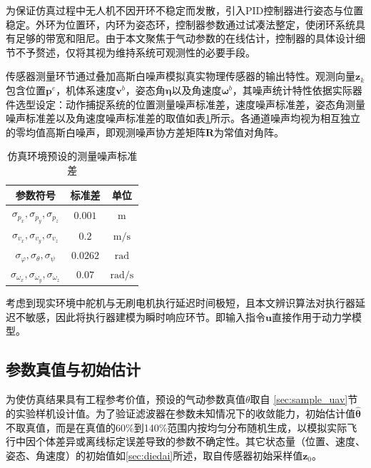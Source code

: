 为保证仿真过程中无人机不因开环不稳定而发散，引入PID控制器进行姿态与位置稳定。外环为位置环，内环为姿态环，控制器参数通过试凑法整定，使闭环系统具有足够的带宽和阻尼。由于本文聚焦于气动参数的在线估计，控制器的具体设计细节不予赘述，仅将其视为维持系统可观测性的必要手段。

传感器测量环节通过叠加高斯白噪声模拟真实物理传感器的输出特性。观测向量$\boldsymbol{z}_k$包含位置$\boldsymbol{p}^e$，机体系速度$\boldsymbol{v}^b$，姿态角$\boldsymbol{\eta}$以及角速度$\boldsymbol{\omega}^b$，其噪声统计特性依据实际器件选型设定：动作捕捉系统的位置测量噪声标准差，速度噪声标准差，姿态角测量噪声标准差以及角速度噪声标准差的取值如表\ref{tab:matlab_noise}所示。各通道噪声均视为相互独立的零均值高斯白噪声，即观测噪声协方差矩阵$\boldsymbol{R}$为常值对角阵。

\begin{table}[htbp]
    \centering
    \caption{仿真环境预设的测量噪声标准差}
    \label{tab:matlab_noise}
    \begin{tabular}{ccc}
    \toprule
    参数符号 & 标准差 & 单位 \\
    \midrule
    $\sigma_{p_x},\sigma_{p_y},\sigma_{p_z}$ & $0.001$ & $\mathrm{m}$ \\
    $\sigma_{v_x},\sigma_{v_y},\sigma_{v_z}$ & $0.2$ & $\mathrm{m/s}$ \\
    $\sigma_{\varphi},\sigma_{\theta},\sigma_{\psi}$ & $0.0262$ & $\mathrm{rad}$ \\
    $\sigma_{\omega_x},\sigma_{\omega_y},\sigma_{\omega_z}$ & $0.07$ & $\mathrm{rad/s}$ \\
    \bottomrule
    \end{tabular}
\end{table}

考虑到现实环境中舵机与无刷电机执行延迟时间极短，且本文辨识算法对执行器延迟不敏感，因此将执行器建模为瞬时响应环节。即输入指令$\boldsymbol{u}$直接作用于动力学模型。

\subsection{参数真值与初始估计}
为使仿真结果具有工程参考价值，预设的气动参数真值$\theta$取自
\ref{sec:sample_uav}节的实验样机设计值。为了验证滤波器在参数未知情况下的收敛能力，初始估计值$\hat{\boldsymbol{\theta}}$不取真值，而是在真值的60\%到140\%范围内按均匀分布随机生成，以模拟实际飞行中因个体差异或离线标定误差导致的参数不确定性。其它状态量（位置、速度、姿态、角速度）的初始值如\ref{sec:diedai}所述，取自传感器初始采样值$\boldsymbol{z}_0$。

